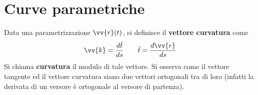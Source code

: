 \documentclass[a4paper, oneside]{article}
\begin{document}
\section{Curve parametriche}
\begin{figure}
    \centering
    \caption{}
\end{figure}
Data una parametrizzazione $\vv{r}(t)$, si definisce il \textbf{vettore curvatura} 
come
\begin{gather*}
    \vv{k} = \frac{d\hat{t}  }{ds}  \qquad \hat{t} = \frac{d\vv{r} }{ds} 
\end{gather*}
Si chiama \textbf{curvatura} il modulo di tale vettore. Si osserva come 
il vettore tangente ed il vettore curvatura siano due vettori ortogonali tra di loro (infatti 
la derivata di un versore è ortogonale al versore di partenza).
\end{document}
